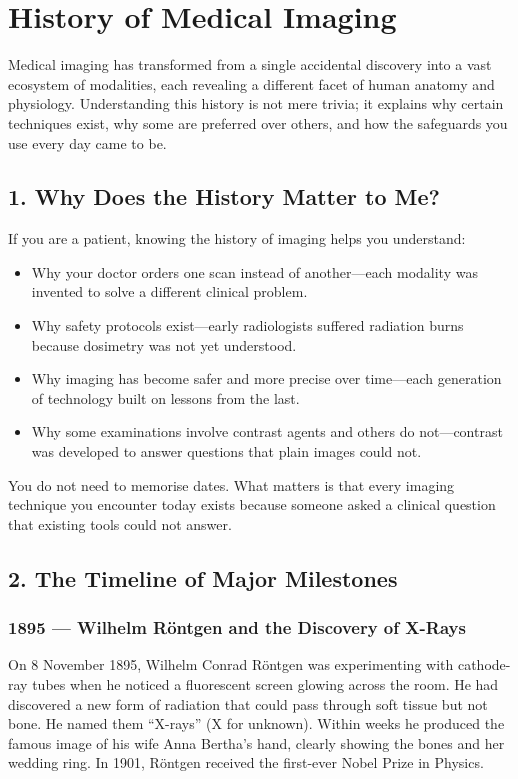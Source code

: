 \chapter{History of Medical Imaging}

\label{ch:ch02_history}

Medical imaging has transformed from a single accidental discovery into a vast ecosystem of modalities, each revealing a different facet of human anatomy and physiology. Understanding this history is not mere trivia; it explains why certain techniques exist, why some are preferred over others, and how the safeguards you use every day came to be.


\section*{1. Why Does the History Matter to Me?}
If you are a patient, knowing the history of imaging helps you understand:
\begin{itemize}
    \item Why your doctor orders one scan instead of another---each modality was invented to solve a different clinical problem.
    \item Why safety protocols exist---early radiologists suffered radiation burns because dosimetry was not yet understood.
    \item Why imaging has become safer and more precise over time---each generation of technology built on lessons from the last.
    \item Why some examinations involve contrast agents and others do not---contrast was developed to answer questions that plain images could not.
\end{itemize}
You do not need to memorise dates. What matters is that every imaging technique you encounter today exists because someone asked a clinical question that existing tools could not answer.


\section*{2. The Timeline of Major Milestones}

\subsection*{1895 --- Wilhelm R\"{o}ntgen and the Discovery of X-Rays}
On 8 November 1895, Wilhelm Conrad R\"{o}ntgen was experimenting with cathode-ray tubes when he noticed a fluorescent screen glowing across the room. He had discovered a new form of radiation that could pass through soft tissue but not bone. He named them ``X-rays'' (X for unknown). Within weeks he produced the famous image of his wife Anna Bertha's hand, clearly showing the bones and her wedding ring. In 1901, R\"{o}ntgen received the first-ever Nobel Prize in Physics.

